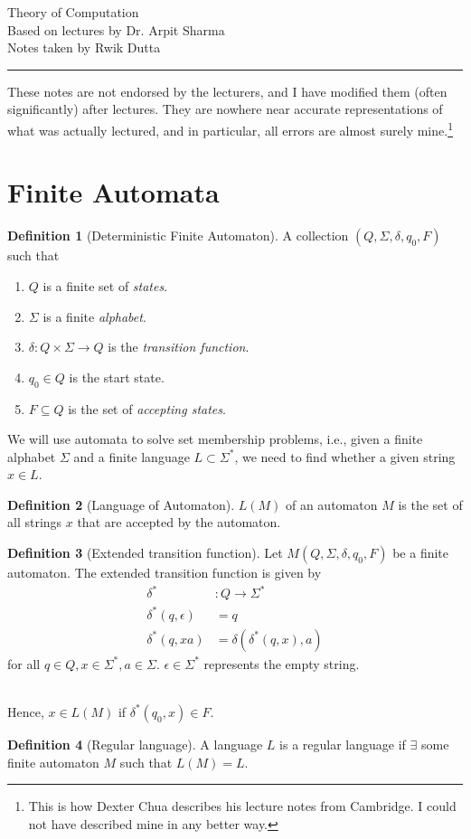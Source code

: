 \documentclass[10pt, a4paper]{extarticle}
\theoremstyle{definition}
\newtheorem{defn}{Definition}
\begin{document}
\begin{center}
	\fontsize{25}{60}\selectfont Theory of Computation \\
	\large Based on lectures by Dr. Arpit Sharma\\
	Notes taken by Rwik Dutta
\end{center}
\hrule
\begin{center}
	These notes are not endorsed by the lecturers, and I have modified them (often
	significantly) after lectures. They are nowhere near accurate representations of what
	was actually lectured, and in particular, all errors are almost surely mine.\footnote[1]{This is how Dexter Chua describes his lecture notes from Cambridge. I could not have described mine in any better way.}
\end{center}
\tableofcontents

\newpage

\section{Finite Automata}
\begin{defn}[Deterministic Finite Automaton]
	A collection $(Q,\Sigma,\delta,q_0,F)$ such that
	\begin{enumerate}
		\item $Q$ is a finite set of \emph{states}.
		\item $\Sigma$ is a finite \emph{alphabet}.
		\item $\delta:Q\times\Sigma\to Q$ is the \emph{transition function}.
		\item $q_0\in Q$ is the start state.
		\item $F\subseteq Q$ is the set of \emph{accepting states}.
\end{enumerate}
\end{defn}
We will use automata to solve set membership problems, i.e., given a finite alphabet $\Sigma$ and a finite language $L\subset \Sigma^*$, we need to find whether a given string $x\in L$.

\begin{defn}[Language of Automaton]
	$L(M)$ of an automaton $M$ is the set of all strings $x$ that are accepted by the automaton.
\end{defn}

\begin{defn}[Extended transition function]
	Let $M(Q,\Sigma,\delta,q_0,F)$ be a finite automaton. The extended transition function is given by
	\begin{align*}
		\delta^*&:Q\to\Sigma^*\\
		\delta^*(q,\epsilon)&=q\\
		\delta^*(q,xa)&=\delta(\delta^*(q,x),a)
	\end{align*}
	for all $q\in Q, x\in\Sigma^*, a\in\Sigma$. $\epsilon\in\Sigma^*$ represents the empty string.
\end{defn}
\hfill\\
Hence, $x\in L(M)$ if $\delta^*(q_0,x)\in F$.

\begin{defn}[Regular language]
	A language $L$ is a regular language if $\exists$ some finite automaton $M$ such that $L(M)=L$.
\end{defn}
\end{document}
